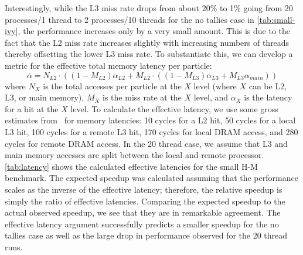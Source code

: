 \documentclass{mc2015}
\begin{document}
Interestingly, while the L3 miss rate drops from about 20\% to 1\% going from
20 processes/1 thread to 2 processes/10 threads for the no tallies case in
\autoref{tab:small-ivy}, the performance increases only by a very small
amount. This is due to the fact that the L2 miss rate increases slightly with
increasing numbers of threads thereby offsetting the lower L3 miss rate. To
substantiate this, we can develop a metric for the effective total memory
latency per particle:
\begin{equation}
  \bar{\alpha} = N_{L2}\cdot \left ( (1-M_{L2})\alpha_{L2} + M_{L2}\cdot((1 -
  M_{L3})\alpha_{L3} + M_{L3}\alpha_{main}) \right )
\end{equation}
where $N_X$ is the total accesses per particle at the $X$ level (where $X$ can
be L2, L3, or main memory), $M_X$ is the miss rate at the $X$ level, and
$\alpha_X$ is the latency for a hit at the $X$ level. To calculate the
effective latency, we use some gross estimates from~\cite{intel} for memory
latencies: 10 cycles for a L2 hit, 50 cycles for a local L3 hit, 100 cycles for
a remote L3 hit, 170 cycles for local DRAM access, and 280 cycles for remote
DRAM access. In the 20 thread case, we assume that L3 and main memory accesses
are split between the local and remote processor. \autoref{tab:latency} shows
the calculated effective latencies for the small H-M benchmark. The expected
speedup was calculated assuming that the performance scales as the inverse of
the effective latency; therefore, the relative speedup is simply the ratio of
effective latencies. Comparing the expected speedup to the actual observed
speedup, we see that they are in remarkable agreement. The effective latency
argument successfully predicts a smaller speedup for the no tallies case as
well as the large drop in performance observed for the 20 thread runs.
\end{document}
